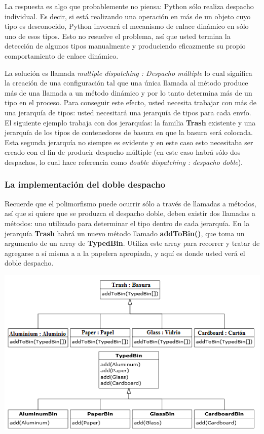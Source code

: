 \documentclass{article}
\begin{document}
La respuesta es algo que probablemente no piensa: Python sólo realiza despacho individual. Es decir, si está realizando una operación en más de un objeto cuyo tipo es desconocido, Python invocará el mecanismo de enlace dinámico en sólo uno de esos tipos. Esto no resuelve el problema, así que usted termina la detección de algunos tipos manualmente y produciendo eficazmente su propio comportamiento de enlace dinámico. \newline

La solución es llamada  \textit{multiple dispatching : Despacho múltiple} lo cual significa la creación de una configuración tal que una única llamada al método produce más de una llamada a un método dinámico y por lo tanto determina más de un tipo en el proceso. Para conseguir este efecto, usted necesita trabajar con más de una jerarquía de tipos: usted necesitará una jerarquía de tipos para cada envío. El siguiente ejemplo trabaja con dos jerarquías: la familia \textbf{Trash} existente y una jerarquía de los tipos de contenedores de basura en que la basura será colocada. Esta segunda jerarquía no siempre es evidente y en este caso esto necesitaba ser creado con el fin de producir despacho múltiple (en este caso habrá sólo dos despachos, lo cual hace referencia como \textit{double dispatching : despacho doble}).
\newpage

\subsubsection{La implementación del doble despacho}

Recuerde que el polimorfismo puede ocurrir sólo a través de llamadas a métodos, así que si quiere que se produzca el despacho doble, deben existir dos llamadas a métodos: uno utilizado para determinar el tipo dentro de cada jerarquía. En la jerarquía \textbf{Trash} habrá un nuevo método llamado \textbf{addToBin()}, que toma un argumento de un array de \textbf{TypedBin}. Utiliza este array para recorrer y tratar de agregarse a sí misma a a la papelera apropiada, y aquí es donde usted verá el doble despacho.          \newline

\includegraphics[width=\textwidth]{DobleDespacho}
\end{document}

